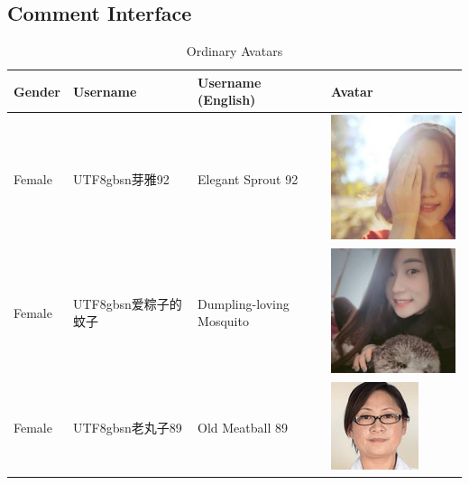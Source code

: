\documentclass[11pt]{article}
\newcommand{\zh}[1]{\begin{CJK*}{UTF8}{gbsn}#1\end{CJK*}}
\begin{document}
\subsection{Comment Interface}
\vspace{-2em}
\begin{table}[H]
  \singlespacing
  \centering
  \caption{Ordinary Avatars}
  \begin{tabular}{|p{}|p{}|p{}|p{}|}
	\hline
	\textbf{Gender} & \textbf{Username} & \textbf{Username (English)} & \textbf{Avatar} \\ \hline
	Female & \zh{芽雅92} & Elegant Sprout 92 & \begin{minipage}{.2\textwidth}\includegraphics[width=.45\linewidth, height=.45\linewidth]{figures/ordinary_avatars/f1.jpg}\end{minipage} \\ \hline
	Female & \zh{爱粽子的蚊子} & Dumpling-loving Mosquito & \begin{minipage}{.2\textwidth}\includegraphics[width=.45\linewidth, height=.45\linewidth]{figures/ordinary_avatars/f2.jpg}\end{minipage} \\ \hline
	Female & \zh{老丸子89} & Old Meatball 89 & \begin{minipage}{.2\textwidth}\includegraphics[width=.45\linewidth, height=.45\linewidth]{figures/ordinary_avatars/f3.jpg}\end{minipage} \\ \hline

\end{tabular}
\end{table}
\end{document}
